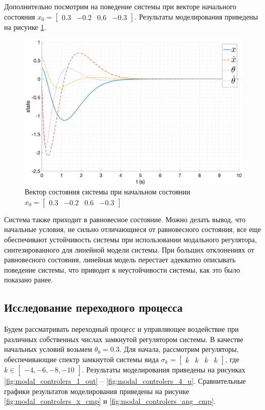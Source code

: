 Дополнительно посмотрим на поведение системы при векторе начального состояния $x_0 = \begin{bmatrix}0.3 & -0.2 & 0.6 & -0.3\end{bmatrix}$. 
Результаты моделирования приведены на рисунке \ref{fig:modal_control_initials_x_2}.
\begin{figure}[ht!]
    \centering
    \includegraphics[width=\textwidth]{media/plots/modal_control_initials/state_7.png}
    \caption{Вектор состояния системы при начальном состоянии $x_0 = \begin{bmatrix}0.3 & -0.2 & 0.6 & -0.3\end{bmatrix}$}
    \label{fig:modal_control_initials_x_2}
\end{figure}

Система также приходит в равновесное состояние. Можно делать вывод, что начальные условия, не сильно отличающиеся от равновесного состояния, 
все еще обеспечивают устойчивость системы при использовании модального регулятора, синтезированного для линейной модели системы. При больших отклонениях
от равновесного состояния, линейная модель перестает адекватно описывать поведение системы, что приводит к неустойчивости системы, как это было показано ранее.

\FloatBarrier
\subsection{Исследование переходного процесса}
Будем рассматривать переходный процесс и управляющее воздействие при различных собственных числах замкнутой регулятором системы. 
В качестве начальных условий возьмем $\theta_0 = 0.3$. Для начала, рассмотрим регуляторы, обеспечивающие спектр 
замкнутой системы вида $\sigma_k = \begin{bmatrix}k & k & k & k\end{bmatrix}$, где $k \in \begin{bmatrix}-4, -6, -8, -10\end{bmatrix}$. 
Результаты моделирования приведены на рисунках \ref{fig:modal_controlers_1_out} -- \ref{fig:modal_controlers_4_u}.
Сравнительные графики результатов моделирования приведены на рисунке \ref{fig:modal_controlers_x_cmp} и \ref{fig:modal_controlers_ang_cmp}.

